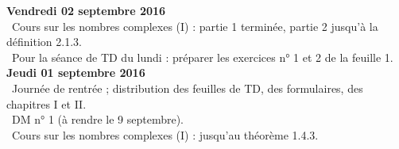 \documentclass[12pt,a4paper]{article}
\begin{document}
% 
%  
%  
% 
% 

\noindent\textbf{Vendredi 02 septembre 2016}\\
\bu\ Cours sur les nombres complexes (I) : partie 1 terminée, partie 2 jusqu'à la définition 2.1.3.\\
\bu\ Pour la séance de TD du lundi : préparer les exercices n° 1 et 2 de la feuille 1. \vspace{.4cm}\\

\noindent\textbf{Jeudi 01 septembre 2016}\\
\bu\ Journée de rentrée ; distribution des feuilles de TD, des formulaires, des
chapitres I et II.  \\
\bu\ DM n° 1 (à
rendre le 9 septembre). \\
\bu\ Cours sur les nombres complexes (I) : jusqu'au théorème 1.4.3. 
\label{end}
\end{document}
